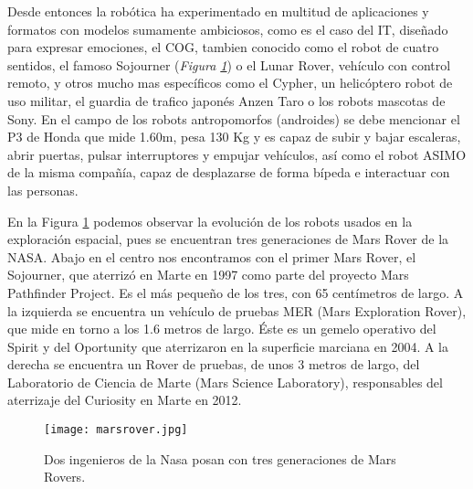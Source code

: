 Desde entonces la robótica ha experimentado en multitud de aplicaciones y formatos con modelos sumamente ambiciosos, como es el caso del IT, diseñado para expresar emociones, el COG, tambien conocido como el robot de cuatro sentidos, el famoso Sojourner (\textit{Figura \ref{fig:marsrover}}) o el Lunar Rover, vehículo con control remoto, y otros mucho mas específicos como el Cypher, un helicóptero robot de uso militar, el guardia de trafico japonés Anzen Taro o los robots mascotas de Sony. En el campo de los robots antropomorfos (androides) se debe mencionar el P3 de Honda que mide 1.60m, pesa 130 Kg y es capaz de subir y bajar escaleras, abrir puertas, pulsar interruptores y empujar vehículos, así como el robot ASIMO de la misma compañía, capaz de desplazarse de forma bípeda e interactuar con las personas.

En la Figura \ref{fig:marsrover} podemos observar la evolución de los robots usados en la exploración espacial, pues se encuentran tres generaciones de Mars Rover de la NASA. Abajo en el centro nos encontramos con el primer Mars Rover, el Sojourner, que aterrizó en Marte en 1997 como parte del proyecto Mars Pathfinder Project. Es el más pequeño de los tres, con 65 centímetros de largo. A la izquierda se encuentra un vehículo de pruebas MER (Mars Exploration Rover), que mide en torno a los 1.6 metros de largo. Éste es un gemelo operativo del Spirit y del Oportunity que aterrizaron en la superficie marciana en 2004. A la derecha se encuentra un Rover de pruebas, de unos 3 metros de largo, del Laboratorio de Ciencia de Marte (Mars Science Laboratory), responsables del aterrizaje del Curiosity en Marte en 2012.

\begin{figure}[t]
	\centering
	\texttt{[image: marsrover.jpg]}
	\caption{Dos ingenieros de la Nasa posan con tres generaciones de Mars Rovers.} \label{fig:marsrover}
\end{figure}

